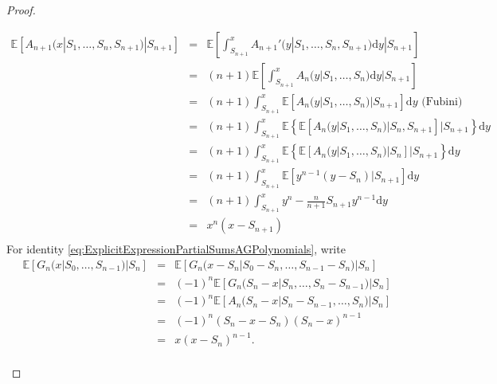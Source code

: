 \begin{proof}
\begin{enumerate}
\begin{eqnarray*}
\mathbb{E}\left[A_{n+1}(x|S_1,\ldots, S_n,S_{n+1})|S_{n+1}\right]&=&\mathbb{E}\left[\int_{S_{n+1}}^x A_{n+1}'(y|S_1,\ldots, S_n,S_{n+1})\text{d}y|S_{n+1}\right]\\
&=&(n+1)\mathbb{E}\left[\int_{S_{n+1}}^x A_{n}(y|S_1,\ldots, S_n)\text{d}y|S_{n+1}\right]\\
&=&(n+1)\int_{S_{n+1}}^x\mathbb{E}\left[A_{n}(y|S_1,\ldots, S_n)|S_{n+1}\right]\text{d}y\text{ (Fubini)}\\
&=&(n+1)\int_{S_{n+1}}^x\mathbb{E}\left\{\mathbb{E}\left[A_{n}(y|S_1,\ldots, S_n)|S_n,S_{n+1}\right]|S_{n+1}\right\}\text{d}y\\
&=&(n+1)\int_{S_{n+1}}^x\mathbb{E}\left\{\mathbb{E}\left[A_{n}(y|S_1,\ldots, S_n)|S_n\right]|S_{n+1}\right\}\text{d}y\\
&=&(n+1)\int_{S_{n+1}}^x\mathbb{E}\left[y^{n-1}(y-S_n)|S_{n+1}\right]\text{d}y\\
&=&(n+1)\int_{S_{n+1}}^xy^n-\frac{n}{n+1}S_{n+1}y^{n-1} \text{d}y\\
&=&x^n(x-S_{n+1})\\
\end{eqnarray*}
For identity \eqref{eq:ExplicitExpressionPartialSumsAGPolynomials}, write 
\begin{eqnarray*}
\mathbb{E}\left[G_{n}(x|S_0,\ldots, S_{n-1})|S_{n}\right]&=&\mathbb{E}\left[G_{n}(x-S_n|S_0 - S_n,\ldots, S_{n-1}-S_n)|S_{n}\right]\\
&=&(-1)^n\mathbb{E}\left[G_{n}(S_n-x|S_n,\ldots, S_{n}-S_{n-1})|S_{n}\right]\\
&=&(-1)^n\mathbb{E}\left[A_{n}(S_n-x|S_{n}-S_{n-1},\ldots, S_n)|S_{n}\right]\\
&=&(-1)^n(S_n-x -S_n)(S_n-x)^{n-1}\\
&=&x(x-S_n)^{n-1}.\\
\end{eqnarray*}
\end{enumerate}
\end{proof}
